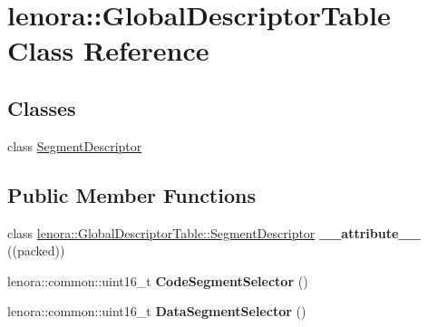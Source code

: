 \hypertarget{classlenora_1_1GlobalDescriptorTable}{}\section{lenora\+:\+:Global\+Descriptor\+Table Class Reference}
\label{classlenora_1_1GlobalDescriptorTable}
\subsection*{Classes}
\begin{DoxyCompactItemize}
\item 
class \hyperlink{classlenora_1_1GlobalDescriptorTable_1_1SegmentDescriptor}{Segment\+Descriptor}
\end{DoxyCompactItemize}
\subsection*{Public Member Functions}
\begin{DoxyCompactItemize}
\item 
\mbox{\label{classlenora_1_1GlobalDescriptorTable_ad08f49a5cb263c7fb7c559798b6b4901}} 
class \hyperlink{classlenora_1_1GlobalDescriptorTable_1_1SegmentDescriptor}{lenora\+::\+Global\+Descriptor\+Table\+::\+Segment\+Descriptor} {\bfseries \+\_\+\+\_\+attribute\+\_\+\+\_\+} ((packed))
\item 
\mbox{\label{classlenora_1_1GlobalDescriptorTable_a97d81f058e0d5a49713ad4894be23ae8}} 
lenora\+::common\+::uint16\+\_\+t {\bfseries Code\+Segment\+Selector} ()
\item 
\mbox{\label{classlenora_1_1GlobalDescriptorTable_a402918f857a5f58b35097d4d36e278fd}} 
lenora\+::common\+::uint16\+\_\+t {\bfseries Data\+Segment\+Selector} ()
\end{DoxyCompactItemize}
